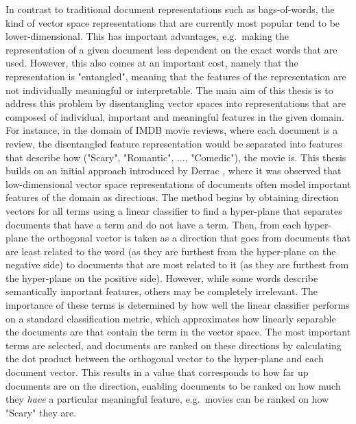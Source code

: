 \documentclass[a4paper,oneside,onecolumn,openright,12pt]{book}
\begin{document}
In contrast to traditional document representations such as bags-of-words, the kind of vector space representations that are currently most popular tend to be lower-dimensional. This has important advantages, e.g.\ making the representation of a given document less dependent on the exact words that are used. However, this also comes at an important cost, namely that the representation is  "entangled", meaning that the features of the representation are not individually meaningful or interpretable. The main aim of this thesis is to address this problem  by disentangling   vector spaces into representations that are composed of individual, important and meaningful features in the given domain. For instance, in the domain of IMDB movie reviews, where each document is a review, the disentangled feature representation would be separated into features that describe how ("Scary", "Romantic", ..., "Comedic"),  the  movie is. This thesis builds on an initial approach introduced by  Derrac \cite{Derrac2015}, where it was  observed that low-dimensional vector space representations of documents  often model important features of the domain as directions. The method begins by obtaining direction vectors for all terms  using a linear classifier to find a hyper-plane that separates documents that have a term and do not have a term. Then, from each hyper-plane the orthogonal vector is taken as a direction that goes from documents that are least related to the word (as they are furthest from the hyper-plane on the negative side) to documents that are most related to it (as they are furthest from the hyper-plane on the positive side). However, while some words describe semantically important features, others may be completely irrelevant. The importance of these terms is determined by how well the linear classifier performs on a standard classification metric,  which approximates how linearly separable the documents are that contain the term in the vector space. The most important terms are selected, and documents are ranked on these directions by calculating the dot product between the orthogonal vector to the hyper-plane and each document vector. This results in  a value that corresponds to how  far up documents are on the direction, enabling    documents to be ranked on how much they \textit{have} a particular meaningful feature,  e.g.\ movies can be ranked on how "Scary" they are. %
\end{document}
